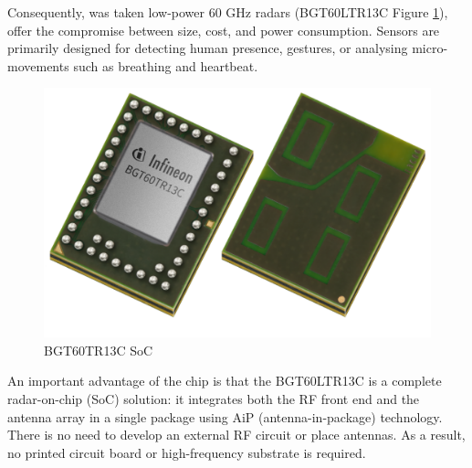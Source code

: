\noindent
\noindent
\noindent
Consequently, was taken low-power 60 GHz radars (BGT60LTR13C Figure \ref{fig:BGT60TR13C}), offer the compromise between size, cost, and power consumption. Sensors are primarily designed for detecting human presence, gestures, or analysing micro-movements such as breathing and heartbeat.
\begin{figure}[H]
    \centering
    \includegraphics[width=0.5\linewidth]{Src/images/lowres-BGT60_WFWLB-40_Combi.tif.png_620533323.png}
    \caption{BGT60TR13C SoC}
    \label{fig:BGT60TR13C}
\end{figure}
An important advantage of the chip is that the BGT60LTR13C is a complete radar-on-chip (SoC) solution: it integrates both the RF front end and the antenna array in a single package using AiP (antenna-in-package) technology. There is no need to develop an external RF circuit or place antennas. As a result, no printed circuit board or high-frequency substrate is required.
